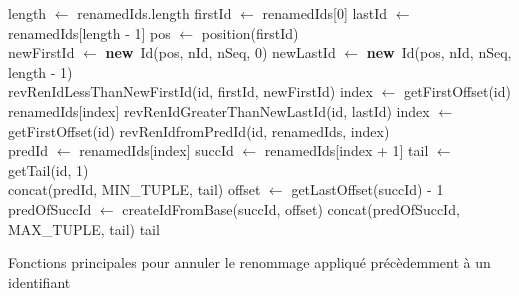 \documentclass[12pt]{thesul}
\newcommand{\new}{\textbf{new}}
\begin{document}
\begin{algorithm}[!ht]
  \footnotesize
  \begin{algorithmic}
          \State length $\gets$ renamedIds.length
          \State firstId $\gets$ renamedIds[0]
          \State lastId $\gets$ renamedIds[length - 1]
          \State pos $\gets$ position(firstId)
          \\
          \State newFirstId $\gets$ \new~Id(pos, nId, nSeq, 0)
          \State newLastId $\gets$ \new~Id(pos, nId, nSeq, length - 1)
          \\
              \State \Return revRenIdLessThanNewFirstId(id, firstId, newFirstId)
              \State index $\gets$ getFirstOffset(id)
              \State \Return renamedIds[index]
              \State \Return revRenIdGreaterThanNewLastId(id, lastId)
          \Else
              \State index $\gets$ getFirstOffset(id)
              \State \Return revRenIdfromPredId(id, renamedIds, index)
          \EndIf
      \EndFunction
      \\
          \State predId $\gets$ renamedIds[index]
          \State succId $\gets$ renamedIds[index + 1]
          \State tail $\gets$ getTail(id, 1)
          \\
              \State {}
              \State \Return concat(predId, MIN\_TUPLE, tail)
              \State {}
              \State offset $\gets$ getLastOffset(succId) - 1
              \State predOfSuccId $\gets$ createIdFromBase(succId, offset)
              \State \Return concat(predOfSuccId, MAX\_TUPLE, tail)
          \Else
              \State \Return tail
          \EndIf
      \EndFunction
  \end{algorithmic}
  \caption{Fonctions principales pour annuler le renommage appliqué précèdemment à un identifiant}
  \label{alg:revertRenameId}
\end{algorithm}
\end{document}
